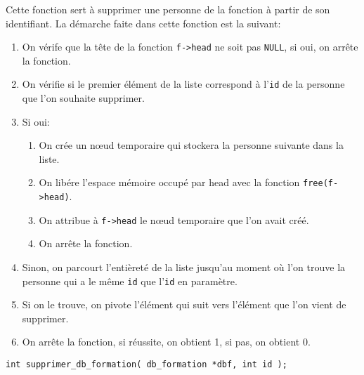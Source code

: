 \documentclass[10pt]{article}
\begin{document}
Cette fonction sert à supprimer une personne de la fonction à partir de son identifiant. La démarche faite dans cette fonction est la suivant:
\begin{enumerate}
\item On vérife que la tête de la fonction \texttt{f->head} ne soit pas \texttt{NULL}, si oui, on arrête la fonction.
\item On vérifie si le premier élément de la liste correspond à l'\texttt{id} de la personne que l'on souhaite supprimer.
\item Si oui:
  \begin{enumerate}
  \item On crée un n\oe{}ud temporaire qui stockera la personne suivante dans la liste.
  \item On libére l'espace mémoire occupé par head avec la fonction \texttt{free(f->head)}.
  \item On attribue à \texttt{f->head} le n\oe{}ud temporaire que l'on avait créé.
  \item On arrête la fonction.
  \end{enumerate}
\item Sinon, on parcourt l'entièreté de la liste jusqu'au moment où l'on trouve la personne qui a le même \texttt{id} que l'\texttt{id} en paramètre.
\item Si on le trouve, on pivote l'élément qui suit vers l'élément que l'on vient de supprimer.
\item On arrête la fonction, si réussite, on obtient 1, si pas, on obtient 0.
\end{enumerate}

\begin{lstlisting}[firstnumber=490]
  int supprimer_db_formation( db_formation *dbf, int id );
\end{lstlisting}
\end{document}
